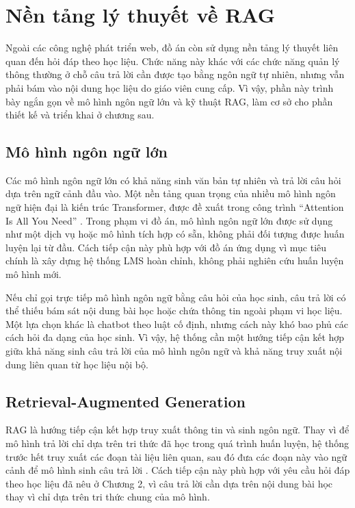 \documentclass[../DoAn.tex]{subfiles}
\begin{document}
\section{Nền tảng lý thuyết về RAG}
\label{section:3.3}

Ngoài các công nghệ phát triển web, đồ án còn sử dụng nền tảng lý thuyết liên quan đến hỏi đáp theo học liệu. Chức năng này khác với các chức năng quản lý thông thường ở chỗ câu trả lời cần được tạo bằng ngôn ngữ tự nhiên, nhưng vẫn phải bám vào nội dung học liệu do giáo viên cung cấp. Vì vậy, phần này trình bày ngắn gọn về mô hình ngôn ngữ lớn và kỹ thuật RAG, làm cơ sở cho phần thiết kế và triển khai ở chương sau.

\subsection{Mô hình ngôn ngữ lớn}
\label{subsection:3.3.1}

Các mô hình ngôn ngữ lớn có khả năng sinh văn bản tự nhiên và trả lời câu hỏi dựa trên ngữ cảnh đầu vào. Một nền tảng quan trọng của nhiều mô hình ngôn ngữ hiện đại là kiến trúc Transformer, được đề xuất trong công trình ``Attention Is All You Need'' \cite{vaswani2017attention}. Trong phạm vi đồ án, mô hình ngôn ngữ lớn được sử dụng như một dịch vụ hoặc mô hình tích hợp có sẵn, không phải đối tượng được huấn luyện lại từ đầu. Cách tiếp cận này phù hợp với đồ án ứng dụng vì mục tiêu chính là xây dựng hệ thống LMS hoàn chỉnh, không phải nghiên cứu huấn luyện mô hình mới.

Nếu chỉ gọi trực tiếp mô hình ngôn ngữ bằng câu hỏi của học sinh, câu trả lời có thể thiếu bám sát nội dung bài học hoặc chứa thông tin ngoài phạm vi học liệu. Một lựa chọn khác là chatbot theo luật cố định, nhưng cách này khó bao phủ các cách hỏi đa dạng của học sinh. Vì vậy, hệ thống cần một hướng tiếp cận kết hợp giữa khả năng sinh câu trả lời của mô hình ngôn ngữ và khả năng truy xuất nội dung liên quan từ học liệu nội bộ.

\subsection{Retrieval-Augmented Generation}
\label{subsection:3.3.2}

RAG là hướng tiếp cận kết hợp truy xuất thông tin và sinh ngôn ngữ. Thay vì để mô hình trả lời chỉ dựa trên tri thức đã học trong quá trình huấn luyện, hệ thống trước hết truy xuất các đoạn tài liệu liên quan, sau đó đưa các đoạn này vào ngữ cảnh để mô hình sinh câu trả lời \cite{lewis2020rag}. Cách tiếp cận này phù hợp với yêu cầu hỏi đáp theo học liệu đã nêu ở Chương 2, vì câu trả lời cần dựa trên nội dung bài học thay vì chỉ dựa trên tri thức chung của mô hình.
\end{document}
